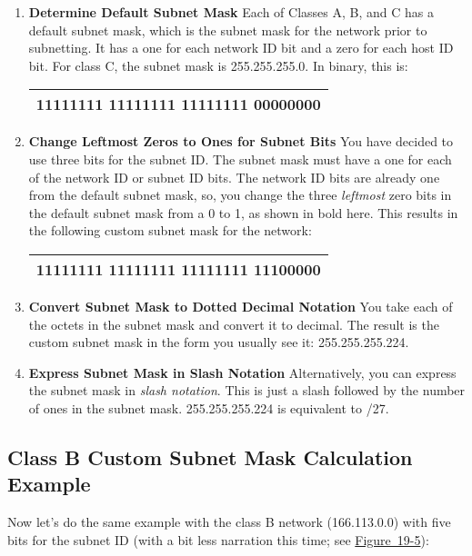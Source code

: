 \begin{enumerate}
\item
  {\textbf{Determine Default Subnet Mask}} Each of Classes A, B, and C
  has a default subnet mask, which is the subnet mask for the network
  prior to subnetting. It has a one for each network ID bit and a zero
  for each host ID bit. For class C, the subnet mask is 255.255.255.0.
  In binary, this is:

  \begin{longtable}[]{@{}l@{}}
  \toprule
  \endhead
  11111111 11111111 11111111 00000000\tabularnewline
  \bottomrule
  \end{longtable}
\item
  {\textbf{Change Leftmost Zeros to Ones for Subnet Bits}} You have
  decided to use three bits for the subnet ID. The subnet mask must have
  a one for each of the network ID or subnet ID bits. The network ID
  bits are already one from the default subnet mask, so, you change the
  three {\emph{leftmost}} zero bits in the default subnet mask from a 0
  to 1, as shown in bold here. This results in the following custom
  subnet mask for the network:

  \begin{longtable}[]{@{}l@{}}
  \toprule
  \endhead
  11111111 11111111 11111111 {\textbf{111}}00000\tabularnewline
  \bottomrule
  \end{longtable}
\item
  {\textbf{Convert Subnet Mask to Dotted Decimal Notation}} You take
  each of the octets in the subnet mask and convert it to decimal. The
  result is the custom subnet mask in the form you usually see it:
  255.255.255.224.
\item
  {\textbf{Express Subnet Mask in
  \protect\hypertarget{ch19s03.htmlux5cux23idx-CHP-19-0750}{}{}Slash
  Notation}} Alternatively, you can express the subnet mask in
  {\emph{slash notation}}. This is just a slash followed by the number
  of ones in the subnet mask. 255.255.255.224 is equivalent to /27.
\end{enumerate}

\subsection{Class B Custom Subnet Mask Calculation Example}

Now let's do the same example with the class B network (166.113.0.0)
with five bits for the subnet ID (with a bit less narration this time;
see
\protect\hyperlink{ch19s03.htmlux5cux23determining_the_custom_subnet_mask-id001}{Figure~19-5}):

